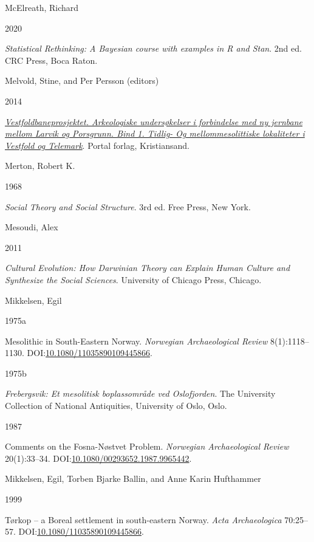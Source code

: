 \documentclass[
  12pt,
  a4paper,
  oneside]{book}
\newlength{\cslhangindent}
\newlength{\csllabelwidth}
\newlength{\cslentryspacingunit} %
\newenvironment{CSLReferences}[2] %
 {%
  \setlength{\parindent}{0pt}
  \ifodd #1
  \let\oldpar\par
  \def\par{\hangindent=\cslhangindent\oldpar}
  \fi
  \setlength{\parskip}{#2\cslentryspacingunit}
 }%
 {}
\newcommand{\CSLBlock}[1]{#1\hfill\break}
\newcommand{\CSLLeftMargin}[1]{\parbox[t]{\csllabelwidth}{#1}}
\newcommand{\CSLRightInline}[1]{\parbox[t]{\linewidth - \csllabelwidth}{#1}\break}
\begin{document}
\begin{CSLReferences}{0}{0}
\leavevmode{}%
\CSLBlock{McElreath, Richard}
\CSLLeftMargin{ 2020}%
\CSLRightInline{\emph{{Statistical Rethinking: A Bayesian course with examples in R and Stan}}. 2nd ed. CRC Press, Boca Raton.}

\leavevmode{}%
\CSLBlock{Melvold, Stine, and Per Persson (editors)}
\CSLLeftMargin{ 2014}%
\CSLRightInline{\emph{\href{https://doi.org/10.23865/noasp.61}{{Vestfoldbaneprosjektet. Arkeologiske undersøkelser i forbindelse med ny jernbane mellom Larvik og Porsgrunn. Bind 1. Tidlig- Og mellommesolittiske lokaliteter i Vestfold og Telemark}}}. Portal forlag, Kristiansand.}

\leavevmode{}%
\CSLBlock{Merton, Robert K.}
\CSLLeftMargin{ 1968}%
\CSLRightInline{\emph{{Social Theory and Social Structure}}. 3rd ed. Free Press, New York.}

\leavevmode{}%
\CSLBlock{Mesoudi, Alex}
\CSLLeftMargin{ 2011}%
\CSLRightInline{\emph{{Cultural Evolution: How Darwinian Theory can Explain Human Culture and Synthesize the Social Sciences}}. University of Chicago Press, Chicago.}

\leavevmode{}%
\CSLBlock{Mikkelsen, Egil}
\CSLLeftMargin{ 1975a}%
\CSLRightInline{{Mesolithic in South-Eastern Norway}. \emph{Norwegian Archaeological Review} 8(1):1118--1130. DOI:\href{https://doi.org/10.1080/11035890109445866}{10.1080/11035890109445866}.}

\leavevmode{}%
\CSLLeftMargin{ 1975b }%
\CSLRightInline{\emph{{Frebergsvik: Et mesolitisk boplassområde ved Oslofjorden}}. The University Collection of National Antiquities, University of Oslo, Oslo.}

\leavevmode{}%
\CSLLeftMargin{ 1987 }%
\CSLRightInline{{Comments on the Fosna-Nøstvet Problem}. \emph{Norwegian Archaeological Review} 20(1):33--34. DOI:\href{https://doi.org/10.1080/00293652.1987.9965442}{10.1080/00293652.1987.9965442}.}

\leavevmode{}%
\CSLBlock{Mikkelsen, Egil, Torben Bjarke Ballin, and Anne Karin Hufthammer}
\CSLLeftMargin{ 1999}%
\CSLRightInline{{Tørkop -- a Boreal settlement in south-eastern Norway}. \emph{Acta Archaeologica} 70:25--57. DOI:\href{https://doi.org/10.1080/11035890109445866}{10.1080/11035890109445866}.}


\end{CSLReferences}
\end{document}
